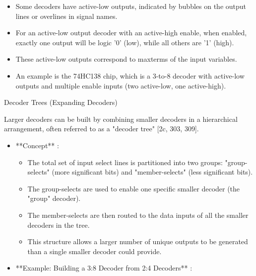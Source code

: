 \documentclass{article}
\begin{document}
\begin{itemize}
\begin{itemize}
        \begin{itemize}
            \item Some decoders have active-low outputs, indicated by bubbles on the output lines or overlines in signal names.
            \item For an active-low output decoder with an active-high enable, when enabled, exactly one output will be logic '0' (low), while all others are '1' (high).
            \item These active-low outputs correspond to maxterms of the input variables.
            \item An example is the 74HC138 chip, which is a 3-to-8 decoder with active-low outputs and multiple enable inputs (two active-low, one active-high).
        \end{itemize}
\end{itemize}

Decoder Trees (Expanding Decoders)

Larger decoders can be built by combining smaller decoders in a hierarchical arrangement, often referred to as a "decoder tree" [2c, 303, 309].

\begin{itemize}
    \item **Concept** :
    
        \begin{itemize}
            \item The total set of input select lines is partitioned into two groups: "group-selects" (more significant bits) and "member-selects" (less significant bits).
            \item The group-selects are used to enable one specific smaller decoder (the "group" decoder).
            \item The member-selects are then routed to the data inputs of all the smaller decoders in the tree.
            \item This structure allows a larger number of unique outputs to be generated than a single smaller decoder could provide.
        \end{itemize}
    \item **Example: Building a 3:8 Decoder from 2:4 Decoders** :
    

\end{itemize}
\end{itemize}
\end{document}
